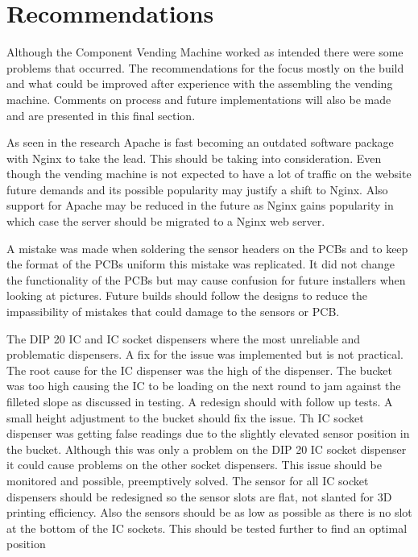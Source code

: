 \documentclass[a4paper,11pt]{article}
\numberwithin{figure}{section}
\numberwithin{table}{section}
\begin{document}
\section{Recommendations}
Although the Component Vending Machine worked as intended there were some problems that occurred. The recommendations for the focus mostly on the build and what could be improved after experience with the assembling the vending machine. Comments on process and future implementations will also be made and are presented in this final section.

As seen in the research Apache is fast becoming an outdated software package with Nginx to take the lead. This should be taking into consideration. Even though the vending machine is not expected to have a lot of traffic on the website future demands and its possible popularity may justify a shift to Nginx. Also support for Apache may be reduced in the future as Nginx gains popularity in which case the server should be migrated to a Nginx web server. 

A mistake was made when soldering the sensor headers on the PCBs and to keep the format of the PCBs uniform this mistake was replicated. It did not change the functionality of the PCBs but may cause confusion for future installers when looking at pictures. Future builds should follow the designs to reduce the impassibility of mistakes that could damage to the sensors or PCB.

The DIP 20 IC and IC socket dispensers where the most unreliable and problematic dispensers. A fix for the issue was implemented but is not practical. The root cause for the IC dispenser was the high of the dispenser. The bucket was too high causing the IC to be loading on the next round to jam against the filleted slope as discussed in testing. A redesign should with follow up tests. A small height adjustment to the bucket should fix the issue. Th IC socket dispenser was getting false readings due to the slightly elevated sensor position in the bucket. Although this was only a problem on the DIP 20 IC socket dispenser it could cause problems on the other socket dispensers. This issue should be monitored and possible, preemptively solved. The sensor for all IC socket dispensers should be redesigned so the sensor slots are flat, not slanted for 3D printing efficiency. Also the sensors should be as low as possible as there is no slot at the bottom of the IC sockets. This should be tested further to find an optimal position
\end{document}
